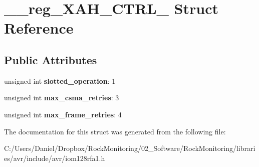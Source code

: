 \hypertarget{struct____reg___x_a_h___c_t_r_l__0}{}\section{\+\_\+\+\_\+reg\+\_\+\+X\+A\+H\+\_\+\+C\+T\+R\+L\+\_ Struct Reference}
\label{struct____reg___x_a_h___c_t_r_l__0}
\subsection*{Public Attributes}
\begin{DoxyCompactItemize}
\item 
unsigned int {\bfseries slotted\+\_\+operation}\+: 1\hypertarget{struct____reg___x_a_h___c_t_r_l__0_adab60a66e0d9dc862a8cd83c2e135cf1}{}\label{struct____reg___x_a_h___c_t_r_l__0_adab60a66e0d9dc862a8cd83c2e135cf1}

\item 
unsigned int {\bfseries max\+\_\+csma\+\_\+retries}\+: 3\hypertarget{struct____reg___x_a_h___c_t_r_l__0_a4a9d3cc398a93a37c8515e4c376ac1d8}{}\label{struct____reg___x_a_h___c_t_r_l__0_a4a9d3cc398a93a37c8515e4c376ac1d8}

\item 
unsigned int {\bfseries max\+\_\+frame\+\_\+retries}\+: 4\hypertarget{struct____reg___x_a_h___c_t_r_l__0_a9367b49989a2fec3fba681e7fe8078e9}{}\label{struct____reg___x_a_h___c_t_r_l__0_a9367b49989a2fec3fba681e7fe8078e9}

\end{DoxyCompactItemize}


The documentation for this struct was generated from the following file\+:\begin{DoxyCompactItemize}
\item 
C\+:/\+Users/\+Daniel/\+Dropbox/\+Rock\+Monitoring/02\+\_\+\+Software/\+Rock\+Monitoring/libraries/avr/include/avr/iom128rfa1.\+h\end{DoxyCompactItemize}
